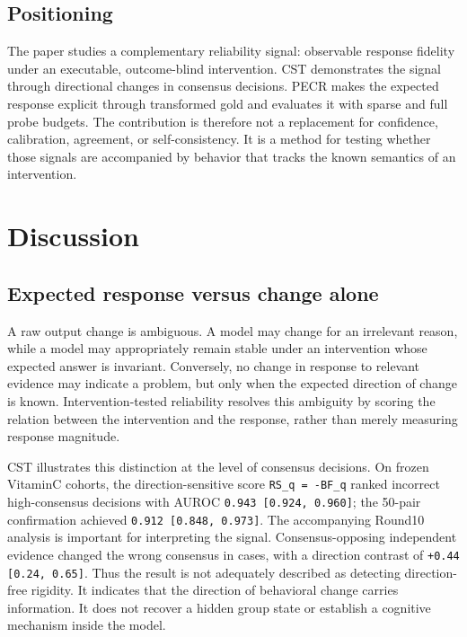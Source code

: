 \documentclass[11pt]{article}
\begin{document}
\subsection{Positioning}

The paper studies a complementary reliability signal: observable response fidelity under an executable, outcome-blind intervention. CST demonstrates the signal through directional changes in consensus decisions. PECR makes the expected response explicit through transformed gold and evaluates it with sparse and full probe budgets. The contribution is therefore not a replacement for confidence, calibration, agreement, or self-consistency. It is a method for testing whether those signals are accompanied by behavior that tracks the known semantics of an intervention.

\section{Discussion}

\subsection{Expected response versus change alone}

A raw output change is ambiguous. A model may change for an irrelevant reason, while a model may appropriately remain stable under an intervention whose expected answer is invariant. Conversely, no change in response to relevant evidence may indicate a problem, but only when the expected direction of change is known. Intervention-tested reliability resolves this ambiguity by scoring the relation between the intervention and the response, rather than merely measuring response magnitude.

CST illustrates this distinction at the level of consensus decisions. On frozen VitaminC cohorts, the direction-sensitive score \texttt{RS\_q = -BF\_q} ranked incorrect high-consensus decisions with AUROC \texttt{0.943 [0.924, 0.960]}; the 50-pair confirmation achieved \texttt{0.912 [0.848, 0.973]}. The accompanying Round10 analysis is important for interpreting the signal. Consensus-opposing independent evidence changed the wrong consensus in  cases, with a direction contrast of \texttt{+0.44 [0.24, 0.65]}. Thus the result is not adequately described as detecting direction-free rigidity. It indicates that the direction of behavioral change carries information. It does not recover a hidden group state or establish a cognitive mechanism inside the model.
\end{document}
